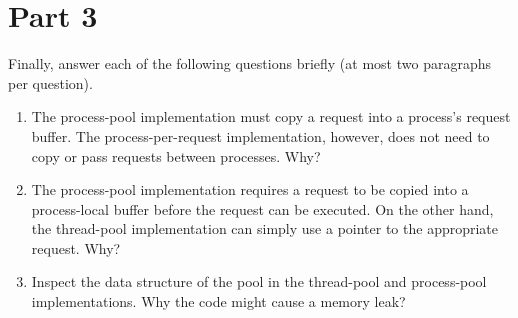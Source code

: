 \documentclass[11pt]{article}
\newcommand{\answer}[1]{}
\newcommand{\answer}[1]{{\color{red}{a: - #1}}}
\begin{document}
\section{Part 3}

Finally, answer each of the following questions briefly (at most two paragraphs per question).

\begin{enumerate}
\item The process-pool implementation must copy a request into a process’s request buffer. The process-per-request implementation, however, does not need to copy or pass requests between processes. Why? \\
    \answer{your answer here...}
    \vspace{10mm}
    
\item The process-pool implementation requires a request to be copied into a process-local buffer before the request can be executed. On the other hand, the thread-pool implementation can simply use a pointer to the appropriate request. Why? \\
    \answer{your answer here...}
    \vspace{10mm}
    
\item Inspect the data structure of the pool in the thread-pool and process-pool implementations. Why the code might cause a memory leak? \\
    \answer{your answer here...}
    \vspace{10mm}
\end{enumerate}
\end{document}
